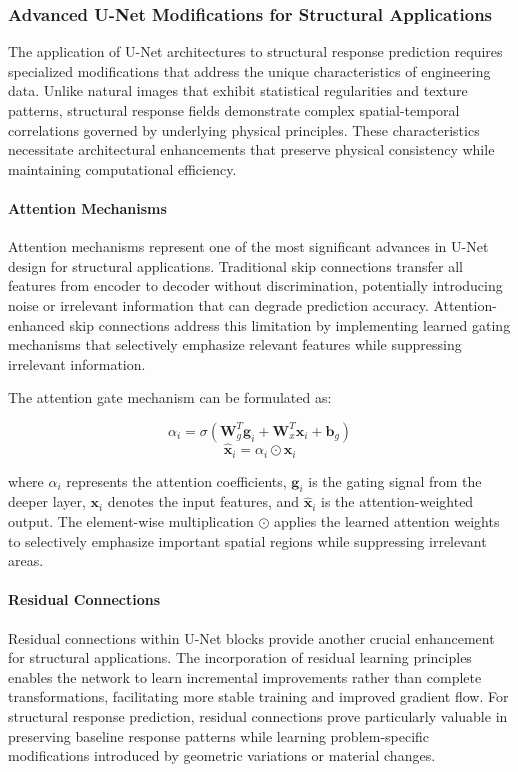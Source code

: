 \documentclass[12pt,a4paper]{report}
\begin{document}
\subsubsection*{Advanced U-Net Modifications for Structural Applications}

The application of U-Net architectures to structural response prediction requires specialized modifications that address the unique characteristics of engineering data. Unlike natural images that exhibit statistical regularities and texture patterns, structural response fields demonstrate complex spatial-temporal correlations governed by underlying physical principles. These characteristics necessitate architectural enhancements that preserve physical consistency while maintaining computational efficiency.

\paragraph{Attention Mechanisms}  
Attention mechanisms represent one of the most significant advances in U-Net design for structural applications. Traditional skip connections transfer all features from encoder to decoder without discrimination, potentially introducing noise or irrelevant information that can degrade prediction accuracy. Attention-enhanced skip connections address this limitation by implementing learned gating mechanisms that selectively emphasize relevant features while suppressing irrelevant information.

The attention gate mechanism can be formulated as:

\begin{equation}
\alpha_i = \sigma(\mathbf{W}_g^T \mathbf{g}_i + \mathbf{W}_x^T \mathbf{x}_i + \mathbf{b}_g)
\end{equation}
\begin{equation}
\hat{\mathbf{x}}_i = \alpha_i \odot \mathbf{x}_i
\end{equation}

where $\alpha_i$ represents the attention coefficients, $\mathbf{g}_i$ is the gating signal from the deeper layer, $\mathbf{x}_i$ denotes the input features, and $\hat{\mathbf{x}}_i$ is the attention-weighted output. The element-wise multiplication $\odot$ applies the learned attention weights to selectively emphasize important spatial regions while suppressing irrelevant areas.

\paragraph{Residual Connections}  
Residual connections within U-Net blocks provide another crucial enhancement for structural applications. The incorporation of residual learning principles enables the network to learn incremental improvements rather than complete transformations, facilitating more stable training and improved gradient flow. For structural response prediction, residual connections prove particularly valuable in preserving baseline response patterns while learning problem-specific modifications introduced by geometric variations or material changes.
\end{document}
